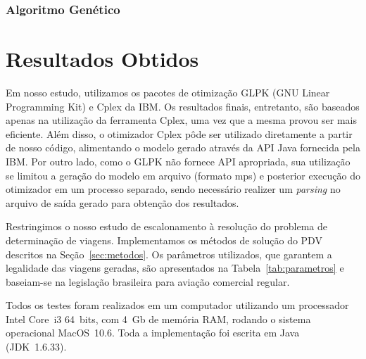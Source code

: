 \documentclass[12pt,a4paper]{article}
\newcommand{\zerar}{\setcounter{equation}{0}\setcounter{figure}{0}\setcounter{table}{0}}
\begin{document}

\subsubsection{Algoritmo Genético}
\label{sec:metodos_genetico}


\zerar
\section{Resultados Obtidos}
\label{sec:resultados}

Em nosso estudo, utilizamos os pacotes de otimização GLPK (GNU Linear Programming Kit) e Cplex da
IBM. Os resultados finais, entretanto, são baseados apenas na utilização da ferramenta Cplex, uma
vez que a mesma provou ser mais eficiente. Além disso, o otimizador Cplex pôde ser utilizado
diretamente a partir de nosso código, alimentando o modelo gerado através da API Java fornecida pela
IBM. Por outro lado, como o GLPK não fornece API apropriada, sua utilização se limitou a geração do
modelo em arquivo (formato mps) e posterior execução do otimizador em um processo separado, sendo
necessário realizer um {\it parsing} no arquivo de saída gerado para obtenção dos resultados.

Restringimos o nosso estudo de escalonamento à resolução do problema de determinação de viagens.
Implementamos os métodos de solução do PDV descritos na Seção~\ref{sec:metodos}. Os parâmetros 
utilizados, que garantem a legalidade das viagens geradas, são apresentados na 
Tabela~\ref{tab:parametros} e baseiam-se na legislação brasileira para aviação comercial regular. 

Todos os testes foram realizados em um computador utilizando um processador Intel Core~i3 64~bits, 
com 4~Gb de memória RAM, rodando o sistema operacional MacOS~10.6. Toda a implementação foi escrita 
em Java (JDK~1.6.33).
\end{document}
